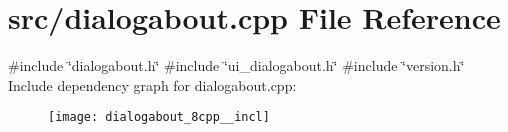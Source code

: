 \section{src/dialogabout.cpp File Reference}
\label{dialogabout_8cpp}
{\ttfamily \#include \char`\"{}dialogabout.\+h\char`\"{}}\newline
{\ttfamily \#include \char`\"{}ui\+\_\+dialogabout.\+h\char`\"{}}\newline
{\ttfamily \#include \char`\"{}version.\+h\char`\"{}}\newline
Include dependency graph for dialogabout.\+cpp\+:\nopagebreak
\begin{figure}[H]
\begin{center}
\leavevmode
\texttt{[image: dialogabout\_8cpp\_\_incl]}
\end{center}
\end{figure}
